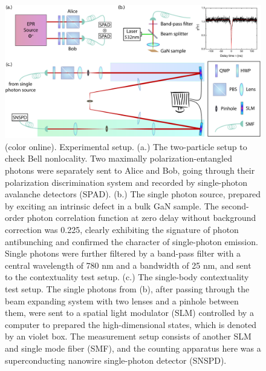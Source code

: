 \documentclass[prl,letterpaper,english,reprint,nofootinbib,aps,superscriptaddress,showpacs,showkeys]{revtex4-1}
\theoremstyle{definition}
\theoremstyle{remark}
\begin{document}
 \begin{figure}[t]
    \centering
    \includegraphics[width=160mm]{fig/exp-sch-draft-v2.pdf}
    \caption{(color online). Experimental setup.
    (a.) The two-particle setup to check Bell nonlocality. Two maximally polarization-entangled photons were separately sent to Alice and Bob, going through their polarization discrimination system and recorded by single-photon avalanche detectors (SPAD).
    (b.) The single photon source, prepared by exciting an intrinsic defect in a bulk GaN sample. The second-order photon correlation function at zero delay without background correction was 0.225, clearly exhibiting the signature of photon antibunching and confirmed the character of single-photon emission. Single photons were further filtered by a band-pass filter with a central wavelength of 780 nm and a bandwidth of 25 nm, and sent to the contextuality test setup.
    (c.) The single-body contextuality test setup.
    The single photons from (b), after passing through the beam expanding system with two lenses and a pinhole between them, were sent to a spatial light modulator (SLM) controlled by a computer to prepared the high-dimensional states, which is denoted by an violet box. The measurement setup consists of another SLM and single mode fiber (SMF), and the counting apparatus here was a superconducting nanowire single-photon detector (SNSPD).}
    \label{fig:exp-sch}
 \end{figure}
\end{document}
